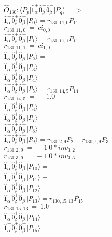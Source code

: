 \documentclass[14pt]{article}
\begin{document}
    $\hat{O}_{130}:  \langle{P_p}\vert \hat{1}_{\alpha}^{+}\hat{0}_{\beta}^{+}\hat{0}_{\beta}^{-} \vert{P_q}\rangle => $ \\ 
    $ \hat{1}_{\alpha}^{+}\hat{0}_{\beta}^{+}\hat{0}_{\beta}^{-} \vert{P_{0}}\rangle = {r}_{130,11,0}P_{11} $ \\ 
    ${r}_{130,11,0}\ =\ {ci}_{0,0} $ \\ 
    $ \hat{1}_{\alpha}^{+}\hat{0}_{\beta}^{+}\hat{0}_{\beta}^{-} \vert{P_{1}}\rangle = {r}_{130,11,1}P_{11} $ \\ 
    ${r}_{130,11,1}\ =\ {ci}_{1,0} $ \\ 
    $ \hat{1}_{\alpha}^{+}\hat{0}_{\beta}^{+}\hat{0}_{\beta}^{-} \vert{P_{2}}\rangle =  $ \\ 
    $ \hat{1}_{\alpha}^{+}\hat{0}_{\beta}^{+}\hat{0}_{\beta}^{-} \vert{P_{3}}\rangle =  $ \\ 
    $ \hat{1}_{\alpha}^{+}\hat{0}_{\beta}^{+}\hat{0}_{\beta}^{-} \vert{P_{4}}\rangle =  $ \\ 
    $ \hat{1}_{\alpha}^{+}\hat{0}_{\beta}^{+}\hat{0}_{\beta}^{-} \vert{P_{5}}\rangle = {r}_{130,14,5}P_{14} $ \\ 
    ${r}_{130,14,5}\ =\ -1.0 $ \\ 
    $ \hat{1}_{\alpha}^{+}\hat{0}_{\beta}^{+}\hat{0}_{\beta}^{-} \vert{P_{6}}\rangle =  $ \\ 
    $ \hat{1}_{\alpha}^{+}\hat{0}_{\beta}^{+}\hat{0}_{\beta}^{-} \vert{P_{7}}\rangle =  $ \\ 
    $ \hat{1}_{\alpha}^{+}\hat{0}_{\beta}^{+}\hat{0}_{\beta}^{-} \vert{P_{8}}\rangle =  $ \\ 
    $ \hat{1}_{\alpha}^{+}\hat{0}_{\beta}^{+}\hat{0}_{\beta}^{-} \vert{P_{9}}\rangle = {r}_{130,2,9}P_{2}+{r}_{130,3,9}P_{3} $ \\ 
    ${r}_{130,2,9}\ =\ -1.0*{inv}_{3,2} $ \\ 
    ${r}_{130,3,9}\ =\ -1.0*{inv}_{3,3} $ \\ 
    $ \hat{1}_{\alpha}^{+}\hat{0}_{\beta}^{+}\hat{0}_{\beta}^{-} \vert{P_{10}}\rangle =  $ \\ 
    $ \hat{1}_{\alpha}^{+}\hat{0}_{\beta}^{+}\hat{0}_{\beta}^{-} \vert{P_{11}}\rangle =  $ \\ 
    $ \hat{1}_{\alpha}^{+}\hat{0}_{\beta}^{+}\hat{0}_{\beta}^{-} \vert{P_{12}}\rangle =  $ \\ 
    $ \hat{1}_{\alpha}^{+}\hat{0}_{\beta}^{+}\hat{0}_{\beta}^{-} \vert{P_{13}}\rangle = {r}_{130,15,13}P_{15} $ \\ 
    ${r}_{130,15,13}\ =\ 1.0 $ \\ 
    $ \hat{1}_{\alpha}^{+}\hat{0}_{\beta}^{+}\hat{0}_{\beta}^{-} \vert{P_{14}}\rangle =  $ \\ 
    $ \hat{1}_{\alpha}^{+}\hat{0}_{\beta}^{+}\hat{0}_{\beta}^{-} \vert{P_{15}}\rangle =  $ \\ 
    
\end{document}
